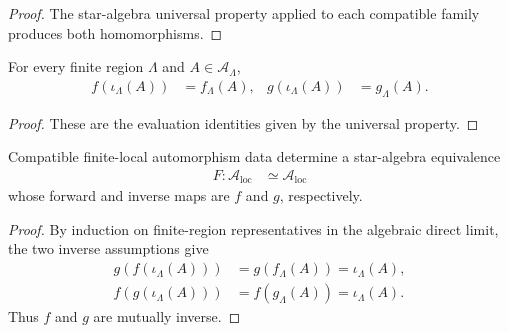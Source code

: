 \begin{proof}\leanok
    The star-algebra universal property applied to each compatible family produces both homomorphisms.
\end{proof}

\begin{lemma}
    \label{lem:qca_compatible_local_homs_evaluation}
    \leanok
    For every finite region $\Lambda$ and $A\in\mathcal A_\Lambda$,
    \begin{align}
        f(\iota_\Lambda(A)) & =f_\Lambda(A), &
        g(\iota_\Lambda(A)) & =g_\Lambda(A).
    \end{align}
\end{lemma}

\begin{proof}\leanok
    These are the evaluation identities given by the universal property.
\end{proof}

\begin{definition}
    \label{def:qca_compatible_algebraic_equiv}
    \leanok
    Compatible finite-local automorphism data determine a star-algebra
    equivalence
    \begin{align}
        F\colon\mathcal A_{\mathrm{loc}}
         & \simeq\mathcal A_{\mathrm{loc}}
    \end{align}
    whose forward and inverse maps are $f$ and $g$, respectively.
\end{definition}

\begin{proof}\leanok
    By induction on finite-region representatives in the algebraic direct limit,
    the two inverse assumptions give
    \begin{align}
        g(f(\iota_\Lambda(A))) & =g(f_\Lambda(A))=\iota_\Lambda(A), \\
        f(g(\iota_\Lambda(A))) & =f(g_\Lambda(A))=\iota_\Lambda(A).
    \end{align}
    Thus $f$ and $g$ are mutually inverse.
\end{proof}

